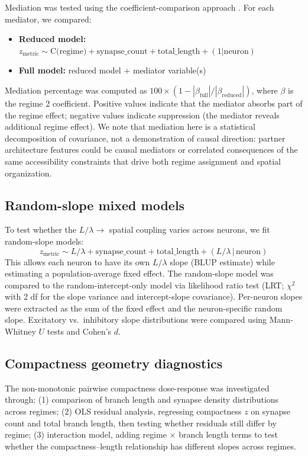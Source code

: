 \documentclass[11pt]{article}
\begin{document}
Mediation was tested using the coefficient-comparison approach \citep{baron1986}. For each mediator, we compared:
\begin{itemize}
    \item \textbf{Reduced model:} $z_{\text{metric}} \sim \text{C(regime)} + \text{synapse\_count} + \text{total\_length} + (1|\text{neuron})$
    \item \textbf{Full model:} reduced model $+$ mediator variable(s)
\end{itemize}
Mediation percentage was computed as $100 \times (1 - |\beta_{\text{full}}| / |\beta_{\text{reduced}}|)$, where $\beta$ is the regime 2 coefficient. Positive values indicate that the mediator absorbs part of the regime effect; negative values indicate suppression (the mediator reveals additional regime effect). We note that mediation here is a statistical decomposition of covariance, not a demonstration of causal direction: partner architecture features could be causal mediators or correlated consequences of the same accessibility constraints that drive both regime assignment and spatial organization.

\subsection{Random-slope mixed models}

To test whether the $L/\lambda \to$ spatial coupling varies across neurons, we fit random-slope models:
\[
z_{\text{metric}} \sim L/\lambda + \text{synapse\_count} + \text{total\_length} + (L/\lambda \,|\, \text{neuron})
\]
This allows each neuron to have its own $L/\lambda$ slope (BLUP estimate) while estimating a population-average fixed effect. The random-slope model was compared to the random-intercept-only model via likelihood ratio test (LRT; $\chi^2$ with 2 df for the slope variance and intercept-slope covariance). Per-neuron slopes were extracted as the sum of the fixed effect and the neuron-specific random slope. Excitatory vs.\ inhibitory slope distributions were compared using Mann-Whitney $U$ tests and Cohen's $d$.

\subsection{Compactness geometry diagnostics}

The non-monotonic pairwise compactness dose-response was investigated through: (1) comparison of branch length and synapse density distributions across regimes; (2) OLS residual analysis, regressing compactness $z$ on synapse count and total branch length, then testing whether residuals still differ by regime; (3) interaction model, adding regime $\times$ branch length terms to test whether the compactness--length relationship has different slopes across regimes.
\end{document}
